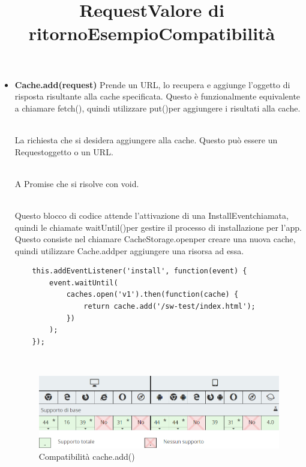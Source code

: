 \documentclass[italian]{article}
\begin{document}
\begin{itemize}
	
	
	
	
	\item \textbf{Cache.add(request)}
	Prende un URL, lo recupera e aggiunge l'oggetto di risposta risultante alla cache specificata. Questo è funzionalmente equivalente a chiamare fetch(), quindi utilizzare put()per aggiungere i risultati alla cache.\\
	\title{\textbf{Request}}\\
	La richiesta che si desidera aggiungere alla cache. Questo può essere un   Requestoggetto o un URL.
	\title{\textbf{Valore di ritorno}}\\
	A Promise che si risolve con void.\\
	\title{\textbf{Esempio}}\\
	Questo blocco di codice attende l'attivazione di una InstallEventchiamata, quindi le chiamate waitUntil()per gestire il processo di installazione per l'app. Questo consiste nel chiamare CacheStorage.openper creare una nuova cache, quindi utilizzare Cache.addper aggiungere una risorsa ad essa.
	\begin{lstlisting}
	this.addEventListener('install', function(event) {
		event.waitUntil(
			caches.open('v1').then(function(cache) {
				return cache.add('/sw-test/index.html');
			})
		);
	});
	\end{lstlisting}
	\title{\textbf{Compatibilità}}\\
	\begin{figure}[h]
		\centering
		\includegraphics[width=1\linewidth]{c3}
		\caption{Compatibilità cache.add()}
		\label{fig:Compatibilità cache.add()}
	\end{figure}
	
	\pagebreak
	

\end{itemize}
\end{document}

